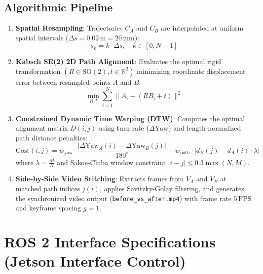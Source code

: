 \documentclass[11pt,a4paper]{article}
\begin{document}
\subsection{Algorithmic Pipeline}
\begin{enumerate}
    \item \textbf{Spatial Resampling}: Trajectories $C_A$ and $C_B$ are interpolated at uniform spatial intervals ($\Delta s = 0.02\,\text{m} = 20\,\text{mm}$):
    \begin{equation}
    s_k = k \cdot \Delta s, \quad k \in [0, N-1]
    \end{equation}
    \item \textbf{Kabsch SE(2) 2D Path Alignment}: Evaluates the optimal rigid transformation $(R \in \text{SO}(2), t \in \mathbb{R}^2)$ minimizing coordinate displacement error between resampled points $A$ and $B$:
    \begin{equation}
    \min_{R, t} \sum_{i=1}^N \|A_i - (R B_i + t)\|^2
    \end{equation}
    \item \textbf{Constrained Dynamic Time Warping (DTW)}: Computes the optimal alignment matrix $D(i, j)$ using turn rate ($\Delta\text{Yaw}$) and length-normalized path distance penalties:
    \begin{equation}
    \text{Cost}(i, j) = w_{\text{yaw}} \cdot \frac{|\Delta\text{Yaw}_A(i) - \Delta\text{Yaw}_B(j)|}{180^\circ} + w_{\text{path}} \cdot |d_B(j) - d_A(i) \cdot \lambda|
    \end{equation}
    where $\lambda = \frac{M}{N}$ and Sakoe-Chiba window constraint $|i - j| \le 0.3 \max(N, M)$.
    \item \textbf{Side-by-Side Video Stitching}: Extracts frames from $V_A$ and $V_B$ at matched path indices $j(i)$, applies Savitzky-Golay filtering, and generates the synchronized video output (\texttt{before\_vs\_after.mp4}) with frame rate $5\,\text{FPS}$ and keyframe spacing $g=1$.
\end{enumerate}

\section{ROS 2 Interface Specifications (Jetson Interface Control)}
\end{document}
